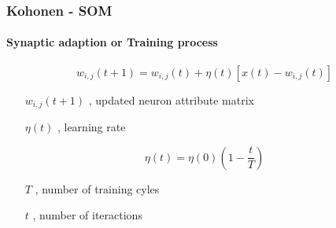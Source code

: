\documentclass[aspectratio=10]{beamer} %
\begin{document}
%	
%



\begin{frame}
 \frametitle{Kohonen - SOM}
 \framesubtitle{Synaptic adaption or Training process}
%

\begin{tcolorbox}[colback=gray!5,colframe=blue!40!black,title=Definition]
\begin{equation}
w_{i,j}(t+1)=w_{i,j}(t)+\eta(t)[x(t)-w_{i,j}(t)] \nonumber
\label{eq2}
\end{equation}  
\end{tcolorbox}

\pause

\begin{itemize}
	\centering
	\item[$w_{i,j}(t+1)$],  updated neuron attribute matrix
	\item[$\eta(t)$], learning rate
\end{itemize}
\pause
\begin{tcolorbox}[colback=gray!5,colframe=blue!40!black,title=Definition]
\begin{equation}
\eta(t)=\eta(0)    ( 1 -  \frac{t}{T}  ) \nonumber
\label{eq3}
\end{equation}  
\end{tcolorbox}

\begin{itemize}
	\centering
	\item[$T$], number of training cyles
	\item[$t$], number of iteractions
\end{itemize}


\end{frame}
\end{document}
